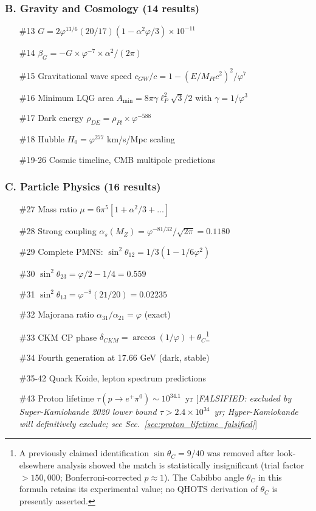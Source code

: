 \documentclass[aps,prd,twocolumn,superscriptaddress,floatfix,nofootinbib]{revtex4-2}
\theoremstyle{definition}
\theoremstyle{remark}
\newcommand{\vp}{\varphi}
\begin{document}
\subsubsection{B. Gravity and Cosmology (14 results)}

\begin{enumerate}
\item[\#13] $G = 2\vp^{13/6}(20/17)(1-\alpha^2\vp/3) \times 10^{-11}$
\item[\#14] $\beta_G = -G \times \vp^{-7} \times \alpha^2/(2\pi)$
\item[\#15] Gravitational wave speed $c_{GW}/c = 1 - (E/M_{Pl}c^2)^2/\vp^7$
\item[\#16] Minimum LQG area $A_{\min} = 8\pi\gamma\ell_P^2\sqrt{3}/2$ with $\gamma = 1/\vp^3$
\item[\#17] Dark energy $\rho_{DE} = \rho_{Pl} \times \vp^{-588}$
\item[\#18] Hubble $H_0 = \vp^{277}$ km/s/Mpc scaling
\item[\#19-26] Cosmic timeline, CMB multipole predictions
\end{enumerate}

\subsubsection{C. Particle Physics (16 results)}

\begin{enumerate}
\item[\#27] Mass ratio $\mu = 6\pi^5[1 + \alpha^2/3 + ...]$
\item[\#28] Strong coupling $\alpha_s(M_Z) = \vp^{-81/32}/\sqrt{2\pi} = 0.1180$
\item[\#29] Complete PMNS: $\sin^2\theta_{12} = 1/3(1-1/6\vp^2)$
\item[\#30] $\sin^2\theta_{23} = \vp/2 - 1/4 = 0.559$
\item[\#31] $\sin^2\theta_{13} = \vp^{-8}(21/20) = 0.02235$
\item[\#32] Majorana ratio $\alpha_{31}/\alpha_{21} = \vp$ (exact)
\item[\#33] CKM CP phase $\delta_{CKM} = \arccos(1/\vp) + \theta_C$\footnote{A previously
claimed identification $\sin\theta_C = 9/40$ was removed after look-elsewhere analysis
showed the match is statistically insignificant (trial factor $> 150{,}000$; Bonferroni-corrected
$p \approx 1$). The Cabibbo angle $\theta_C$ in this formula retains its experimental value;
no QHOTS derivation of $\theta_C$ is presently asserted.}
\item[\#34] Fourth generation at 17.66 GeV (dark, stable)
\item[\#35-42] Quark Koide, lepton spectrum predictions
\item[\#43] Proton lifetime $\tau(p \to e^+\pi^0) \sim 10^{34.1}$~yr [\textit{FALSIFIED: excluded
  by Super-Kamiokande 2020 lower bound $\tau > 2.4 \times 10^{34}$~yr; Hyper-Kamiokande will
  definitively exclude; see Sec.~\ref{sec:proton_lifetime_falsified}}]
\end{enumerate}
\end{document}
